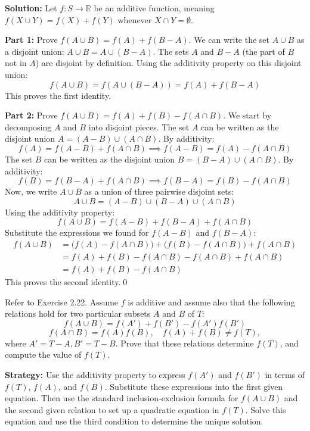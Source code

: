\bigskip\noindent\textbf{Solution:}  
Let $f: S \to \mathbb{R}$ be an additive function, meaning $f(X \cup Y) = f(X) + f(Y)$ whenever $X \cap Y = \emptyset$.

\textbf{Part 1:} Prove $f(A \cup B) = f(A) + f(B - A)$.
We can write the set $A \cup B$ as a disjoint union: $A \cup B = A \cup (B - A)$. The sets $A$ and $B-A$ (the part of $B$ not in $A$) are disjoint by definition.
Using the additivity property on this disjoint union:
\[ f(A \cup B) = f(A \cup (B-A)) = f(A) + f(B-A) \]
This proves the first identity.

\textbf{Part 2:} Prove $f(A \cup B) = f(A) + f(B) - f(A \cap B)$.
We start by decomposing $A$ and $B$ into disjoint pieces.
The set $A$ can be written as the disjoint union $A = (A - B) \cup (A \cap B)$. By additivity:
\[ f(A) = f(A - B) + f(A \cap B) \implies f(A-B) = f(A) - f(A \cap B) \]
The set $B$ can be written as the disjoint union $B = (B - A) \cup (A \cap B)$. By additivity:
\[ f(B) = f(B - A) + f(A \cap B) \implies f(B-A) = f(B) - f(A \cap B) \]
Now, we write $A \cup B$ as a union of three pairwise disjoint sets:
\[ A \cup B = (A - B) \cup (B - A) \cup (A \cap B) \]
Using the additivity property:
\[ f(A \cup B) = f(A-B) + f(B-A) + f(A \cap B) \]
Substitute the expressions we found for $f(A-B)$ and $f(B-A)$:
\begin{align*}
f(A \cup B) &= \big(f(A) - f(A \cap B)\big) + \big(f(B) - f(A \cap B)\big) + f(A \cap B) \\
&= f(A) + f(B) - f(A \cap B) - f(A \cap B) + f(A \cap B) \\
&= f(A) + f(B) - f(A \cap B)
\end{align*}
This proves the second identity.\qed



\begin{problembox}
\begin{problemstatement}
Refer to Exercise 2.22. Assume \(f\) is additive and assume also that the following relations hold for two particular subsets \(A\) and \(B\) of \(T\):
\[
f(A \cup B) = f(A') + f(B') - f(A')f(B')
\]
\[
f(A \cap B) = f(A)f(B), \quad f(A) + f(B) \ne f(T),
\]
where \(A' = T - A, B' = T - B\). Prove that these relations determine \(f(T)\), and compute the value of \(f(T)\).
\end{problemstatement}
\end{problembox}

\noindent\textbf{Strategy:} Use the additivity property to express $f(A')$ and $f(B')$ in terms of $f(T)$, $f(A)$, and $f(B)$. Substitute these expressions into the first given equation. Then use the standard inclusion-exclusion formula for $f(A \cup B)$ and the second given relation to set up a quadratic equation in $f(T)$. Solve this equation and use the third condition to determine the unique solution.

